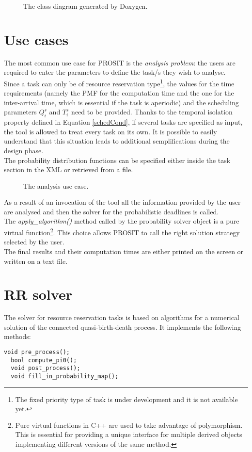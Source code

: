 \begin{figure}[H]
  \caption{The class diagram generated by Doxygen.}
  \label{automaton}
\end{figure}

\section{Use cases}
The most common use case for PROSIT is the \emph{analysis problem}: the users are required to enter the parameters to define the task/s they wish to analyse.\\
Since a task can only be of resource reservation type\footnote{The fixed priority type of task is under development and it is not available yet.}, the values for the time requirements (namely the PMF for the computation time and the one for the inter-arrival time, which is essential if the task is aperiodic) and the scheduling parameters \( Q_{i}^s \) and \( T_{i}^s \) need to be provided. Thanks to the temporal isolation property defined in Equation \ref{schedCond}, if several tasks are specified as input, the tool is allowed to treat every task on its own. It is possible to easily understand that this situation leads to additional semplifications during the design phase.\\ 
The probability distribution functions can be specified either inside the task section in the XML or retrieved from a file.
\begin{figure}[H]
  \caption{The analysis use case.}
  \label{usecase}
\end{figure}

As a result of an invocation of the tool all the information provided by the user are analysed and then the solver for the probabilistic deadlines is called.\\ 
The \emph{apply\_algorithm()} method called by the probability solver object is a pure virtual function\footnote{Pure virtual functions in C++ are used to take advantage of polymorphism. This is essential for providing a unique interface for multiple derived objects implementing different versions of the same method.}. This choice allows PROSIT to call the right solution strategy selected by the user.\\
The final results and their computation times are either printed on the screen or written on a text file.

\section{RR solver}
The solver for resource reservation tasks is based on algorithms for a numerical solution of the connected quasi-birth-death process. It implements the following methods:
\begin{lstlisting}[frame=bt]
  void pre_process();
  bool compute_pi0();
  void post_process();
  void fill_in_probability_map();
\end{lstlisting}

